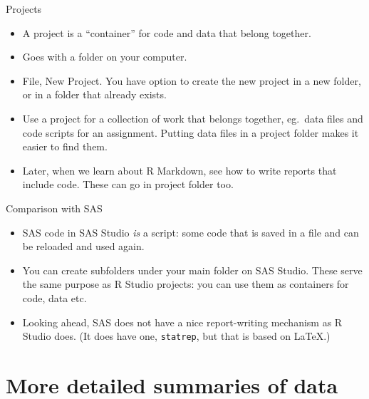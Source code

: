 \documentclass[unknownkeysallowed]{beamer}\usepackage[]{graphicx}\usepackage[]{color}
\begin{document}
\begin{frame}[fragile]{Projects}
  
  \begin{itemize}
  \item A project is a ``container'' for code and data that belong
    together.
  \item Goes with a folder on your computer.
  \item File, New Project. You have option to create the new project
    in a new folder, or in a folder that already exists.
  \item Use a project for a collection of work that belongs together,
    eg.\ data files and code scripts for an assignment. Putting data
    files in a project folder makes it easier to find them.
  \item Later, when we learn about R Markdown, see how to write
    reports that include code. These can go in project folder too.
  \end{itemize}
  
\end{frame}

\begin{frame}[fragile]{Comparison with SAS}
  
  \begin{itemize}
  \item SAS code in SAS Studio \emph{is} a script: some code that is
    saved in a file and can be reloaded and used again.
  \item You can create subfolders under your main folder on SAS
    Studio. These serve the same purpose as R Studio projects: you can
    use them as containers for code, data etc.
  \item Looking ahead, SAS does not have a nice report-writing
    mechanism as R Studio does. (It does have one, \texttt{statrep},
    but that is based on \LaTeX.)
  \end{itemize}
  
\end{frame}



\section{More detailed summaries of data}

\frame{\sectionpage}
\end{document}
